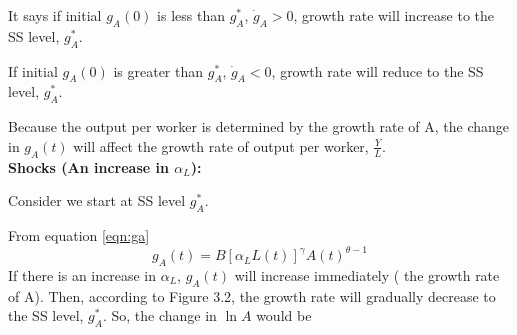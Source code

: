 \documentclass[12pt]{article}
\begin{document}
\begin{figure}[H]
\end{figure}



It says if initial $ g_{A}(0) $ is less than $ g_{A}^{*} $, $ \dot{g}_{A} > 0$,
growth rate will increase to the SS level, $ g_{A}^{*} $.

If initial $ g_{A}(0) $ is greater than $ g_{A}^{*} $, $ \dot{g}_{A} < 0$,
growth rate will reduce to the SS level, $ g_{A}^{*} $.

Because the output per worker is determined by the growth rate of A, the change in
$ g_{A}(t) $ will affect the growth rate of output per worker, $ \frac{Y}{L} $.\\


{\textbf {Shocks (An increase in $ \alpha_{L} $):}}

Consider we start at SS level $ g_{A}^{*} $.

From equation \eqref{eqn:ga}
\begin{equation*}
		g_{A}(t) = B[\alpha_{L}L(t)]^{\gamma}A(t)^{\theta - 1}
\end{equation*}
If there is an increase in $ \alpha_{L} $, $ g_{A}(t) $ will increase immediately (
the growth rate of A). Then, according to Figure 3.2, the growth rate will gradually
decrease to the SS level, $ g_{A}^{*} $. So, the change in $ \ln A $ would be

\begin{figure}[H]
\end{figure}
\end{document}
